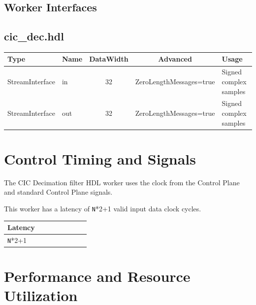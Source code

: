 \documentclass{article}
\def\comp{cic\_dec}
\begin{document}
\begin{landscape}
	\section*{Worker Interfaces}
	\subsection*{\comp.hdl}
	\begin{scriptsize}
		\begin{tabular}{|M{2cm}|M{1.5cm}|c|c|M{12cm}|}
			\hline
			Type            & Name & DataWidth & Advanced                & Usage                  \\
			\hline
			StreamInterface & in   & 32        & ZeroLengthMessages=true & Signed complex samples \\
			\hline
			StreamInterface & out  & 32        & ZeroLengthMessages=true & Signed complex samples \\
			\hline
		\end{tabular}
	\end{scriptsize}
\end{landscape}

\section*{Control Timing and Signals}
\begin{flushleft}
	The CIC Decimation filter HDL worker uses the clock from the Control Plane and standard Control Plane signals.\medskip


	This worker has a latency of \verb+N+*2+1 valid input data clock cycles.\medskip

	\begin{tabular}{|M{4.5cm}|M{4.5cm}|M{1cm}|M{1.5cm}|M{2cm}|M{1cm}|M{1cm}|M{2.5cm}|}
		\hline
		\hline
		Latency         \\
		\hline
		\verb+N+*2+1    \\
		\hline
	\end{tabular}
\end{flushleft}

\section*{Performance and Resource Utilization}
\end{document}
